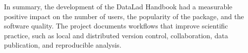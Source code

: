 In summary, the development of the DataLad Handbook had a measurable positive impact on the number of users, the popularity of the package, and the software quality.
The project documents workflows that improve scientific practice, such as local and distributed version control, collaboration, data publication, and reproducible analysis.


\pagebreak

